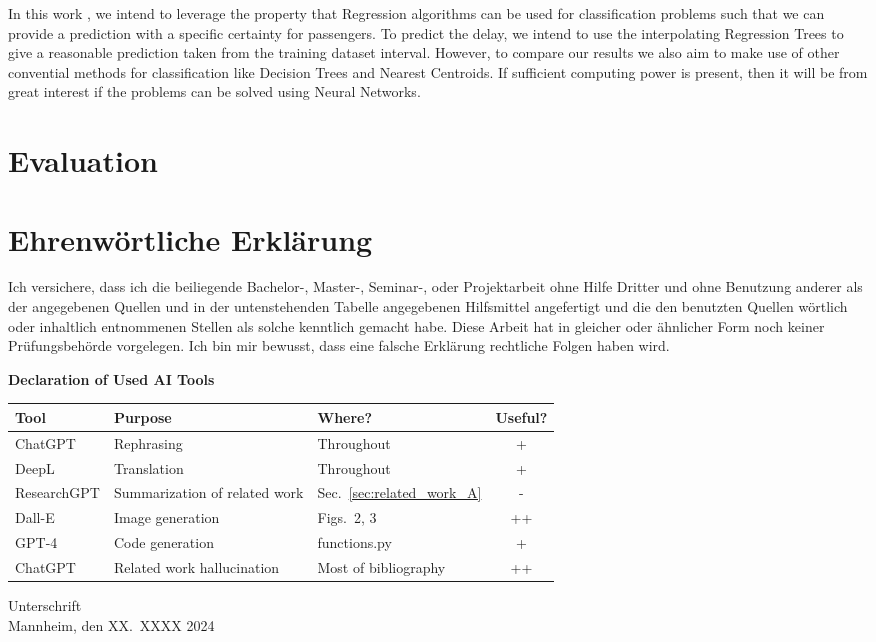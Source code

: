 \documentclass[a4paper,oneside,bibliography=totoc]{scrbook}
\begin{document}
In this work , we intend to leverage the property that Regression algorithms can be used for classification problems such that we can provide a prediction with a specific certainty for passengers. To predict the delay, we intend to
use the interpolating Regression Trees to give a reasonable prediction taken from the training dataset interval. However, to compare our results we also aim to make use of other convential methods for classification like Decision Trees and Nearest Centroids.
If sufficient computing power is present, then it will be from great interest if the problems can be solved using Neural Networks.

\chapter{Evaluation}\label{ch:eval}



\backmatter
\chapter{Ehrenwörtliche Erklärung}

Ich versichere, dass ich die beiliegende Bachelor-, Master-, Seminar-, oder
Projektarbeit ohne Hilfe Dritter und ohne Benutzung anderer als der angegebenen
Quellen und in der untenstehenden Tabelle angegebenen Hilfsmittel angefertigt
und die den benutzten Quellen wörtlich oder inhaltlich entnommenen Stellen als
solche kenntlich gemacht habe. Diese Arbeit hat in gleicher oder ähnlicher Form
noch keiner Prüfungsbehörde vorgelegen. Ich bin mir bewusst, dass eine falsche
Erklärung rechtliche Folgen haben wird.

\begin{center}
  \textbf{Declaration of Used AI Tools} \\[.3em]
  \begin{tabularx}{\textwidth}{lXlc}
    \toprule
    Tool & Purpose & Where? & Useful? \\
    \midrule
    ChatGPT & Rephrasing & Throughout & + \\
    DeepL & Translation & Throughout & + \\
    ResearchGPT & Summarization of related work & Sec.~\ref{sec:related_work_A} & - \\
    Dall-E & Image generation & Figs.~2, 3 & ++ \\
    GPT-4 & Code generation & functions.py & + \\
    ChatGPT & Related work hallucination & Most of bibliography & ++ \\
    \bottomrule
  \end{tabularx}
\end{center}

\vspace{2cm}
\noindent Unterschrift\\
\noindent Mannheim, den XX.~XXXX 2024 \hfill
\end{document}
